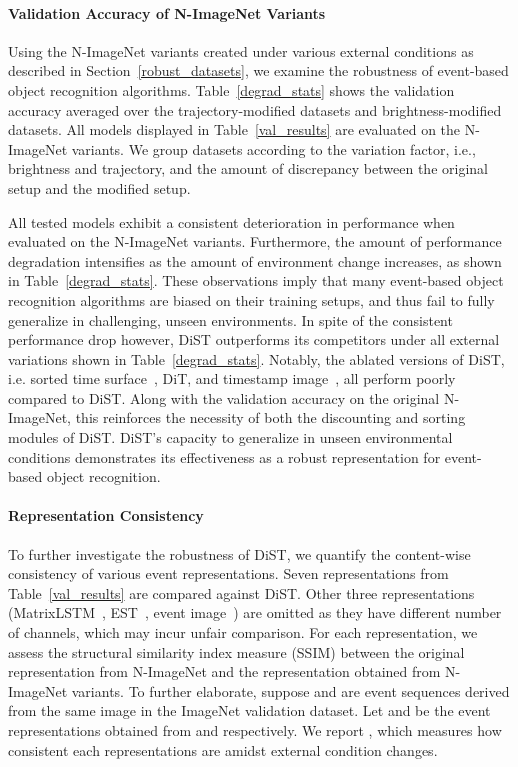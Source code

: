 \paragraph{\textbf{Validation Accuracy of N-ImageNet Variants}} 
Using the N-ImageNet variants created under various external conditions as described in Section~\ref{robust_datasets}, we examine the robustness of event-based object recognition algorithms.
Table~\ref{degrad_stats} shows the validation accuracy averaged over the trajectory-modified datasets and brightness-modified datasets.
All models displayed in Table~\ref{val_results} are evaluated on the N-ImageNet variants.
We group datasets according to the variation factor, i.e., brightness and trajectory, and the amount of discrepancy between the original setup and the modified setup.

All tested models exhibit a consistent deterioration in performance when evaluated on the N-ImageNet variants.
Furthermore, the amount of performance degradation intensifies as the amount of environment change increases, as shown in Table~\ref{degrad_stats}.
These observations imply that many event-based object recognition algorithms are biased on their training setups, and thus fail to fully generalize in challenging, unseen environments.
In spite of the consistent performance drop however, DiST outperforms its competitors under all external variations shown in Table~\ref{degrad_stats}.
Notably, the ablated versions of DiST, i.e. sorted time surface~\cite{ace}, DiT, and timestamp image~\cite{timestamp_image}, all perform poorly compared to DiST.
Along with the validation accuracy on the original N-ImageNet, this reinforces the necessity of both the discounting and sorting modules of DiST.
DiST's capacity to generalize in unseen environmental conditions demonstrates its effectiveness as a robust representation for event-based object recognition.

\paragraph{\textbf{Representation Consistency}} To further investigate the robustness of DiST, we quantify the content-wise consistency of various event representations.
Seven representations from Table~\ref{val_results} are compared against DiST.
Other three representations (MatrixLSTM~\cite{matrix_lstm}, EST~\cite{est}, event image~\cite{ev_gait}) are omitted as they have different number of channels, which may incur unfair comparison.
For each representation, we assess the structural similarity index measure (SSIM) between the original representation from N-ImageNet and the representation obtained from N-ImageNet variants.
To further elaborate, suppose  and  are event sequences derived from the same image in the ImageNet validation dataset.
Let  and  be the event representations obtained from  and  respectively.
We report , which measures how consistent each representations are amidst external condition changes.


